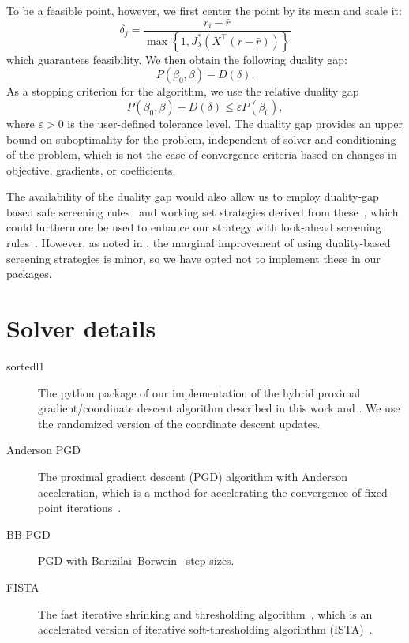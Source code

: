 \documentclass[article]{jss}
\begin{document}
\begin{appendix}
  To be a feasible point, however, we first center the point by its mean and
  scale it:
  \[
    \delta_j = \frac{r_i - \bar{r}}{\max\left\{1, J_\lambda^*\left(X^\intercal(r - \bar{r})\right) \right\}}
  \]
  which guarantees feasibility. We then obtain the following duality gap:
  \[
    P(\beta_0, \beta) - D(\delta).
  \]
  As a stopping criterion for the algorithm, we use the relative duality gap
  \[
    P(\beta_0, \beta) - D(\delta) \leq \varepsilon P(\beta_0),
  \]
  where \(\varepsilon >0\) is the user-defined tolerance level.
  The duality gap provides an upper bound on suboptimality for the problem, independent
  of solver and conditioning of the problem, which is not the case of
  convergence criteria based on changes in objective, gradients, or coefficients.

  The availability of the duality gap would also allow us to employ
  duality-gap based safe screening rules~\citep{fercoq2015} and
  working set strategies derived from these~\citep{massias2018}, which
  could furthermore be used to enhance our strategy with look-ahead
  screening rules~\citep{larsson2021a}. However,
  as noted in \citet{larsson2022d}, the marginal improvement
  of using duality-based screening strategies is minor, so we have
  opted not to implement these in our packages.

  \section{Solver details}\label{sec:solver-details}

  \begin{description}
    \item[sortedl1] The python package of our implementation of the hybrid
          proximal gradient/coordinate descent algorithm described in this work and
          \citet{larsson2023}. We use the randomized version of the coordinate descent
          updates.
    \item[Anderson PGD] The proximal gradient descent (PGD) algorithm with Anderson acceleration, which is a
          method for accelerating the convergence of fixed-point
          iterations~\citep{anderson1965,zhang2020}.
    \item[BB PGD] PGD with Barizilai--Borwein~\citep{barzilai1988} step sizes.

    \item[FISTA] The fast iterative shrinking and thresholding
          algorithm~\citep{beck2009}, which is an accelerated version of iterative
          soft-thresholding algorihthm (ISTA)~\citep{wright2009}.


\end{description}
\end{appendix}
\end{document}
